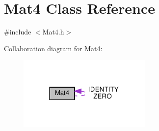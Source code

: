 \hypertarget{classMat4}{}\section{Mat4 Class Reference}
\label{classMat4}


{\ttfamily \#include $<$Mat4.\+h$>$}



Collaboration diagram for Mat4\+:
\nopagebreak
\begin{figure}[H]
\begin{center}
\leavevmode
\includegraphics[width=186pt]{classMat4__coll__graph}
\end{center}
\end{figure}
